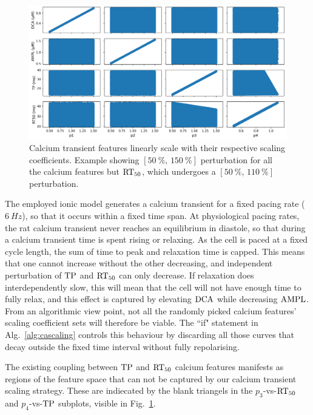 \begin{figure}[!ht]
    \myfloatalign
    \includegraphics[width=\textwidth]{figures/chapter06/p_vs_b.png}
    \caption{Calcium transient features linearly scale with their respective scaling coefficients. Example showing $[\SI{50}{\percent},\,\SI{150}{\percent}]$ perturbation for all the calcium features but $\textrm{RT}_{50}$, which undergoes a $[\SI{50}{\percent},\,\SI{110}{\percent}]$ perturbation.}
    \label{fig:scalersvscafeatures}
\end{figure}

\vspace{0.2cm}
The employed ionic model generates a calcium transient for a fixed pacing rate ($\SI{6}{Hz}$), so that it occurs within a fixed time span. At physiological pacing rates, the rat calcium transient never reaches an equilibrium in diastole, so that during a calcium transient time is spent rising or relaxing. As the cell is paced at a fixed cycle length, the sum of time to peak and relaxation time is capped. This means that one cannot increase without the other decreasing, and independent perturbation of $\textrm{TP}$ and $\textrm{RT}_{50}$ can only decrease. If relaxation does interdependently slow, this will mean that the cell will not have enough time to fully relax, and this effect is captured by elevating $\textrm{DCA}$ while decreasing $\textrm{AMPL}$. From an algorithmic view point, not all the randomly picked calcium features' scaling coefficient sets will therefore be viable. The ``if" statement in Alg.~\ref{alg:cascaling} controls this behaviour by discarding all those curves that decay outside the fixed time interval without fully repolarising.

\vspace{0.2cm}
The existing coupling between $\textrm{TP}$ and $\textrm{RT}_{50}$ calcium features manifests as regions of the feature space that can not be captured by our calcium transient scaling strategy. These are indiecated by the blank triangels in the $p_3$-vs-$\textrm{RT}_{50}$ and $p_4$-vs-$\textrm{TP}$ subplots, visible in Fig.~\ref{fig:scalersvscafeatures}.




